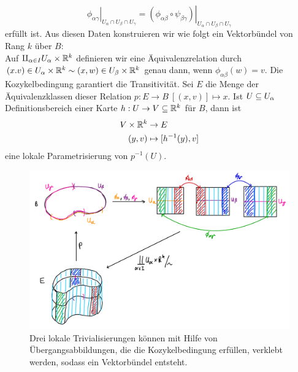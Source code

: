 \begin{bemerkung}
\begin{equation}
\left. \phi_{\alpha \gamma} \right|_{U_\alpha \cap U_\beta \cap U_\gamma} = \left. \left(\phi_{\alpha \beta} \circ \psi_{\beta \gamma} \right) \right|_{U_\alpha \cap U_\beta \cap U_\gamma}
\end{equation}
erfüllt ist. Aus diesen Daten konstruieren wir wie folgt ein Vektorbündel von Rang $k$ über $B$:\\
Auf $\amalg_{\alpha \in I} U_\alpha \times \mathbb{R}^k$ definieren wir eine Äquivalenzrelation durch $(x. v) \in U_\alpha \times \mathbb{R}^k \sim (x, w) \in U_\beta \times \mathbb{R}^k$ genau dann, wenn $\phi_{\alpha \beta}(w)=v$. Die Kozykelbedingung garantiert die Transitivität. Sei $E$ die Menge der Äquivalenzklassen dieser Relation $p: E \to B \ [(x,v)] \mapsto x$. Ist $U \subseteq U_\alpha$ Definitionsbereich einer Karte $h: U \to V \subseteq \mathbb{R}^k$ für $B$, dann ist 
\begin{align}
V \times \mathbb{R}^k &\to E \\
(y, v) &\mapsto [h^{-1}(y), v]
\end{align}
eine lokale Parametrisierung von $p^{-1}(U)$.
\begin{figure}[H]
\label{fig:vektorbuendel}
\centering
\includegraphics[width=0.5\linewidth]{Bilder/kozykelkonstrukt.png}
\caption{Drei lokale Trivialisierungen können mit Hilfe von Übergangsabbildungen, die die Kozykelbedingung erfüllen, verklebt werden, sodass ein Vektorbündel entsteht.}
\end{figure}
\end{bemerkung}
